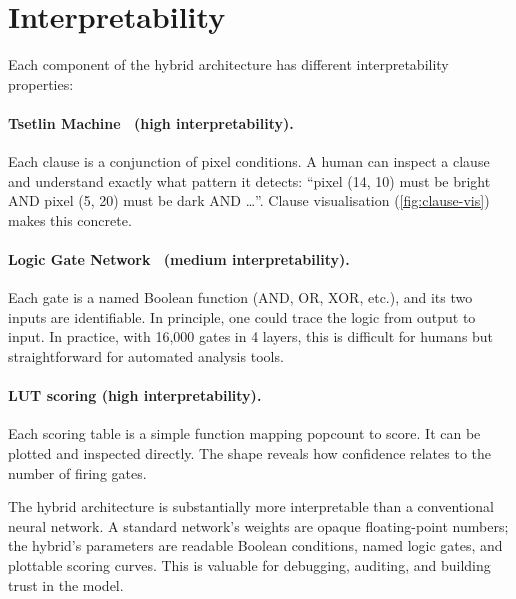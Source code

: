 \section{Interpretability}
\label{sec:interpretability}

Each component of the hybrid architecture has different
interpretability properties:

\paragraph{Tsetlin Machine~\cite{granmo2018tsetlin} (high interpretability).}
Each clause is a conjunction of pixel conditions. A human can inspect
a clause and understand exactly what pattern it detects: ``pixel (14, 10)
must be bright AND pixel (5, 20) must be dark AND \ldots''. Clause
visualisation (\cref{fig:clause-vis}) makes this concrete.

\paragraph{Logic Gate Network~\cite{petersen2022difflogic} (medium interpretability).}
Each gate is a named Boolean function (AND, OR, XOR, etc.), and its
two inputs are identifiable. In principle, one could trace the logic
from output to input. In practice, with 16,000 gates in 4 layers,
this is difficult for humans but straightforward for automated
analysis tools.

\paragraph{LUT scoring (high interpretability).}
Each scoring table is a simple function mapping popcount to score.
It can be plotted and inspected directly. The shape reveals how
confidence relates to the number of firing gates.

\begin{keyinsight}
The hybrid architecture is substantially more interpretable than a
conventional neural network. A standard network's weights are opaque
floating-point numbers; the hybrid's parameters are readable Boolean
conditions, named logic gates, and plottable scoring curves. This is
valuable for debugging, auditing, and building trust in the model.
\end{keyinsight}


